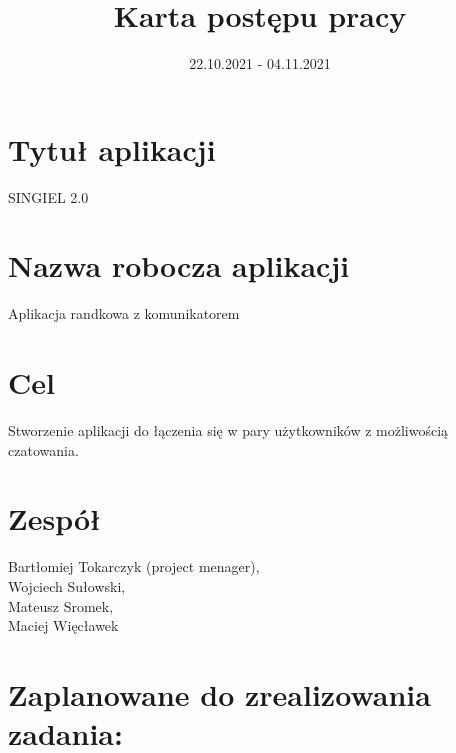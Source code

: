 \documentclass[12pt,a4paper]{article}
\begin{document}
\title{Karta postępu pracy}
\date{22.10.2021 - 04.11.2021}

\maketitle


\section*{Tytuł aplikacji}
SINGIEL 2.0
\section*{Nazwa robocza aplikacji}
Aplikacja randkowa z komunikatorem
\section*{Cel}
Stworzenie aplikacji do łączenia się w pary użytkowników z możliwością czatowania.
\section*{Zespół}
Bartłomiej Tokarczyk  (project menager), \\
Wojciech Sułowski, \\
Mateusz Sromek, \\
Maciej Więcławek \\
\newpage

\section{Zaplanowane do zrealizowania zadania:}
\end{document}

